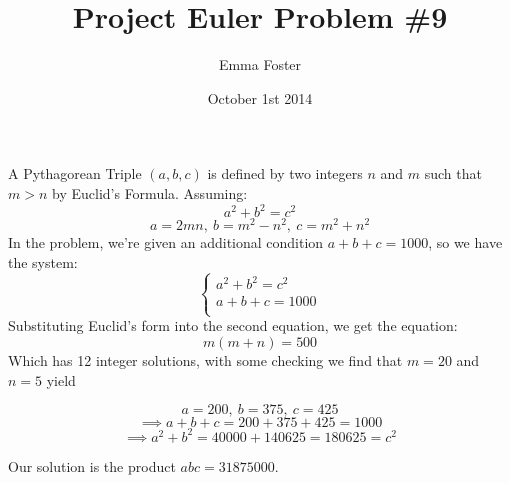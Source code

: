 \documentclass[12pt]{article}
\begin{document}
\title{Project Euler Problem \#9} 
\author{Emma Foster} 
\date{October 1st 2014} 
\maketitle

A Pythagorean Triple $(a,b,c)$ is defined by two integers $n$ and $m$ such that $m > n$ by Euclid's Formula. Assuming:
$$a^2 + b^2 = c^2$$
$$a = 2mn, ~b = m^2 - n^2, ~c = m^2 + n^2$$
In the problem, we're given an additional condition $a + b + c = 1000$, so we have the system:
$$
\begin{cases}
	a^2 + b^2 = c^2
    \\
	a + b + c = 1000
    \\
\end{cases}
$$
Substituting Euclid's form into the second equation, we get the equation:
$$m(m+n) = 500$$
Which has 12 integer solutions, with some checking we find that $m = 20$ and $n = 5$ yield

$$a = 200, ~b = 375, ~c = 425$$
$$\implies a + b + c = 200 + 375 + 425 = 1000$$
$$\implies a^2 + b^2 = 40000 + 140625 = 180625 = c^2$$

Our solution is the product $abc = 31875000$.
\end{document}
